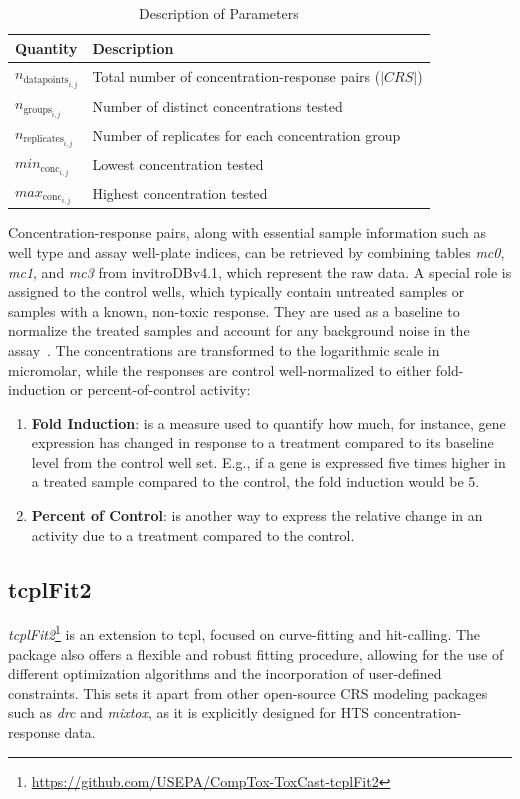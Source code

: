 \begin{table}
    \centering
    \caption{Description of Parameters}
    \label{tab:concentrations_quantities}
    \begin{tabular}{ll}
        \toprule
        \textbf{Quantity} & \textbf{Description} \\
        \midrule
        $n_{\text{datapoints}_{i,j}}$ & Total number of concentration-response pairs ($|CRS|$) \\
        $n_{\text{groups}_{i,j}}$ & Number of distinct concentrations tested \\
        $n_{\text{replicates}_{i,j}}$ & Number of replicates for each concentration group \\
        $min_{\text{conc}_{i,j}}$ & Lowest concentration tested \\
        $max_{\text{conc}_{i,j}}$ & Highest concentration tested \\
        \bottomrule
    \end{tabular}
\end{table}

Concentration-response pairs, along with essential sample information such as well type and assay well-plate indices, can be retrieved by combining tables \emph{mc0}, \emph{mc1}, and \emph{mc3} from invitroDBv4.1, which represent the raw data. A special role is assigned to the control wells, which typically contain untreated samples or samples with a known, non-toxic response. They are used as a baseline to normalize the treated samples and account for any background noise in the assay~\cite{sheffield2021}. The concentrations are transformed to the logarithmic scale in micromolar, while the responses are control well-normalized to either fold-induction or percent-of-control activity:

\begin{enumerate}
    \item \textbf{Fold Induction}: is a measure used to quantify how much, for instance, gene expression has changed in response to a treatment compared to its baseline level from the control well set. E.g., if a gene is expressed five times higher in a treated sample compared to the control, the fold induction would be 5.
    \item \textbf{Percent of Control}: is another way to express the relative change in an activity due to a treatment compared to the control.
\end{enumerate}


\subsection{tcplFit2}\label{sec:tcplfit2}
\emph{tcplFit2}\footnote{\url{https://github.com/USEPA/CompTox-ToxCast-tcplFit2}} is an extension to tcpl, focused on curve-fitting and hit-calling. The package also offers a flexible and robust fitting procedure, allowing for the use of different optimization algorithms and the incorporation of user-defined constraints. This sets it apart from other open-source CRS modeling packages such as \emph{drc} and \emph{mixtox}, as it is explicitly designed for HTS concentration-response data.

